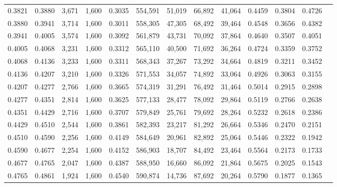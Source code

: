 \begin{tabular}{rrrrrrrrrrrrr}
0.3821 & 0.3880 &  3,671 & 1,600 &                                     0.3035 & 554,591 &  51,019 &  66,892 &  41,064 & 0.4459 & 0.3804 & 0.4726 \\
0.3880 & 0.3941 &  3,714 & 1,600 &                                     0.3011 & 558,305 &  47,305 &  68,492 &  39,464 & 0.4548 & 0.3656 & 0.4382 \\
0.3941 & 0.4005 &  3,574 & 1,600 &                                     0.3092 & 561,879 &  43,731 &  70,092 &  37,864 & 0.4640 & 0.3507 & 0.4051 \\
0.4005 & 0.4068 &  3,231 & 1,600 &                                     0.3312 & 565,110 &  40,500 &  71,692 &  36,264 & 0.4724 & 0.3359 & 0.3752 \\
0.4068 & 0.4136 &  3,233 & 1,600 &                                     0.3311 & 568,343 &  37,267 &  73,292 &  34,664 & 0.4819 & 0.3211 & 0.3452 \\
0.4136 & 0.4207 &  3,210 & 1,600 &                                     0.3326 & 571,553 &  34,057 &  74,892 &  33,064 & 0.4926 & 0.3063 & 0.3155 \\
0.4207 & 0.4277 &  2,766 & 1,600 &                                     0.3665 & 574,319 &  31,291 &  76,492 &  31,464 & 0.5014 & 0.2915 & 0.2898 \\
0.4277 & 0.4351 &  2,814 & 1,600 &                                     0.3625 & 577,133 &  28,477 &  78,092 &  29,864 & 0.5119 & 0.2766 & 0.2638 \\
0.4351 & 0.4429 &  2,716 & 1,600 &                                     0.3707 & 579,849 &  25,761 &  79,692 &  28,264 & 0.5232 & 0.2618 & 0.2386 \\
0.4429 & 0.4510 &  2,544 & 1,600 &                                     0.3861 & 582,393 &  23,217 &  81,292 &  26,664 & 0.5346 & 0.2470 & 0.2151 \\
0.4510 & 0.4590 &  2,256 & 1,600 &                                     0.4149 & 584,649 &  20,961 &  82,892 &  25,064 & 0.5446 & 0.2322 & 0.1942 \\
0.4590 & 0.4677 &  2,254 & 1,600 &                                     0.4152 & 586,903 &  18,707 &  84,492 &  23,464 & 0.5564 & 0.2173 & 0.1733 \\
0.4677 & 0.4765 &  2,047 & 1,600 &                                     0.4387 & 588,950 &  16,660 &  86,092 &  21,864 & 0.5675 & 0.2025 & 0.1543 \\
0.4765 & 0.4861 &  1,924 & 1,600 &                                     0.4540 & 590,874 &  14,736 &  87,692 &  20,264 & 0.5790 & 0.1877 & 0.1365 \\

\end{tabular}
